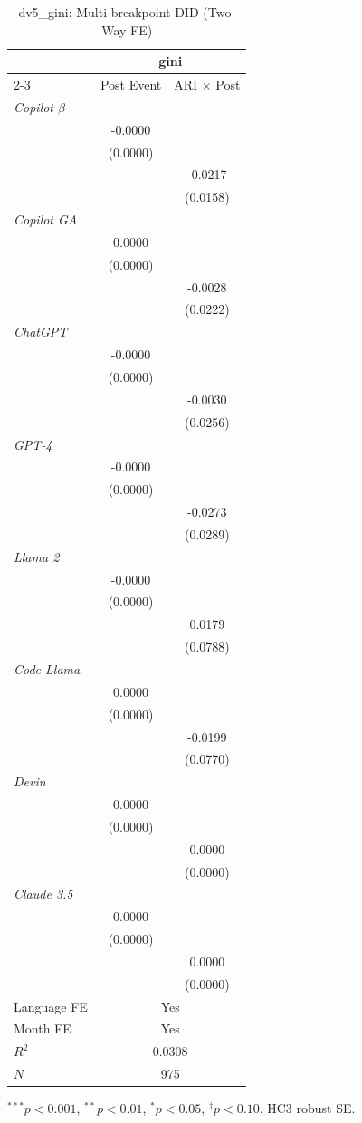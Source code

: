 \begin{table}[htbp]\centering
\caption{dv5_gini: Multi-breakpoint DID (Two-Way FE)}
\begin{tabular}{lcc}
\toprule
 & \multicolumn{2}{c}{gini} \\
\cmidrule(l){2-3}
 & Post Event & ARI $\times$ Post \\
\midrule
\textit{Copilot $\beta$} & & \\
 & -0.0000 & \\
 & (0.0000) & \\
 &  & -0.0217 \\
 &  & (0.0158) \\
\textit{Copilot GA} & & \\
 & 0.0000 & \\
 & (0.0000) & \\
 &  & -0.0028 \\
 &  & (0.0222) \\
\textit{ChatGPT} & & \\
 & -0.0000 & \\
 & (0.0000) & \\
 &  & -0.0030 \\
 &  & (0.0256) \\
\textit{GPT-4} & & \\
 & -0.0000 & \\
 & (0.0000) & \\
 &  & -0.0273 \\
 &  & (0.0289) \\
\textit{Llama 2} & & \\
 & -0.0000 & \\
 & (0.0000) & \\
 &  & 0.0179 \\
 &  & (0.0788) \\
\textit{Code Llama} & & \\
 & 0.0000 & \\
 & (0.0000) & \\
 &  & -0.0199 \\
 &  & (0.0770) \\
\textit{Devin} & & \\
 & 0.0000 & \\
 & (0.0000) & \\
 &  & 0.0000 \\
 &  & (0.0000) \\
\textit{Claude 3.5} & & \\
 & 0.0000 & \\
 & (0.0000) & \\
 &  & 0.0000 \\
 &  & (0.0000) \\
\midrule
Language FE & \multicolumn{2}{c}{Yes} \\
Month FE    & \multicolumn{2}{c}{Yes} \\
$R^2$ & \multicolumn{2}{c}{0.0308} \\
$N$   & \multicolumn{2}{c}{975} \\
\bottomrule
\end{tabular}
{\footnotesize $^{***}p<0.001$, $^{**}p<0.01$, $^{*}p<0.05$, $^{\dagger}p<0.10$. HC3 robust SE.}
\end{table}